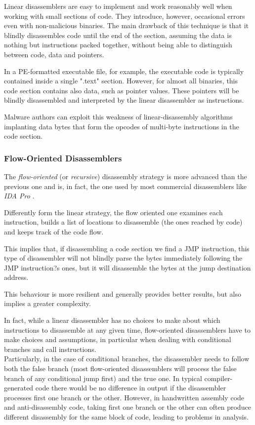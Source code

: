 \documentclass[pdfa%
,cucitura%
]{toptesi}
\begin{document}
Linear disassemblers are easy to implement and work reasonably well when working with small sections of code. They introduce, however, occasional errors even with non-malicious binaries. The main drawback of this technique is that it blindly disassembles code until the end of the section, assuming the data is nothing but instructions packed together, without being able to distinguish between code, data and pointers.

In a PE-formatted executable file, for example, the executable code is typically contained inside a single ".text" section. However, for almost all binaries, this code section contains also data, such as pointer values. These pointers will be blindly disassembled and interpreted by the linear disassembler as instructions.

Malware authors can exploit this weakness of linear-disassembly algorithms implanting data bytes that form the opcodes of multi-byte instructions in the code section.

\subsubsection{Flow-Oriented Disassemblers}
The \textit{flow-oriented} (or \textit{recursive}) disassembly strategy is more advanced than the previous one and is, in fact, the one used by most commercial disassemblers like \textit{IDA Pro} \cite{SikorskiPMA}.

Differently form the linear strategy, the flow oriented one examines each instruction, builds a list of locations to disassemble (the ones reached by code) and keeps track of the code flow.

This implies that, if disassembling a code section we find a JMP instruction, this type of disassembler will not blindly parse the bytes immediately following the JMP instruction?s ones, but it will disassemble the bytes at the jump destination address.

This behaviour is more resilient and generally provides better results, but also implies a greater complexity.

In fact, while a linear disassembler has no choices to make about which instructions to disassemble at any given time, flow-oriented disassemblers have to make choices and assumptions, in particular when dealing with conditional branches and call instructions.\\
Particularly, in the case of conditional branches, the disassembler needs to follow both the false branch (most flow-oriented disassemblers will process the false branch of any conditional jump first) and the true one. In typical compiler-generated code there would be no difference in output if the disassembler processes first one branch or the other. However, in handwritten assembly code and anti-disassembly code, taking first one branch or the other can often produce different disassembly for the same block of code, leading to problems in analysis.
\end{document}
